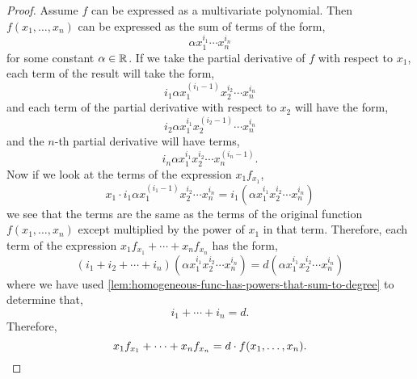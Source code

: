 \documentclass[MathsNotesBase.tex]{subfiles}
\begin{document}
{		\bigskip
		\begin{proof}
			Assume $f$ can be expressed as a multivariate polynomial. Then $f(x_1, \dots, x_n)$ can be expressed as the sum of terms of the form,
			\[ \alpha x_1^{i_1} \cdots x_n^{i_n} \]
			for some constant ${ \alpha \in \mathbb{R}^{} }$. If we take the partial derivative of $f$ with respect to $x_1$, each term of the result will take the form,
			\[ i_1 \alpha x_1^{(i_1 - 1)}x_2^{i_2}\cdots x_n^{i_n} \]
			and each term of the partial derivative with respect to $x_2$ will have the form,
			\[ i_2 \alpha x_1^{i_1}x_2^{(i_2 - 1)}\cdots x_n^{i_n} \]
			and the $n$-th partial derivative will have terms,
			\[ i_n \alpha x_1^{i_1}x_2^{i_2}\cdots x_n^{(i_n - 1)}. \]
			Now if we look at the terms of the expression $x_1f_{x_1}$,
			\[ x_1 \cdot i_1 \alpha x_1^{(i_1 - 1)}x_2^{i_2}\cdots x_n^{i_n} = i_1 (\alpha x_1^{i_1}x_2^{i_2}\cdots x_n^{i_n}) \]
			we see that the terms are the same as the terms of the original function $f(x_1, \dots, x_n)$ except multiplied by the power of $x_1$ in that term. Therefore, each term of the expression ${ x_1f_{x_1} + \cdots + x_nf_{x_n} }$ has the form,
			\[ (i_1 + i_2 + \cdots + i_n)(\alpha x_1^{i_1}x_2^{i_2}\cdots x_n^{i_n}) = d(\alpha x_1^{i_1}x_2^{i_2}\cdots x_n^{i_n}) \]
			where we have used \autoref{lem:homogeneous-func-has-powers-that-sum-to-degree} to determine that,
			\[ i_1 + \cdots + i_n = d. \]
			Therefore,
			\[ x_1f_{x_1} + \cdots + x_nf_{x_n} = d \cdot f(x_1, \dots, x_n). \qedhere \]
		\end{proof}
	}
\end{document}
